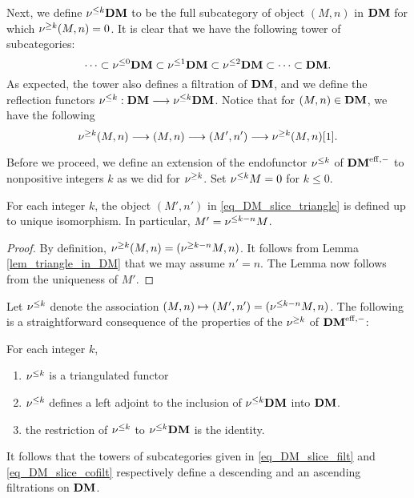 Next, we define $\nu^{\leq k} \mathbf{DM}$ to be the full subcategory of 
object $(M, n)$ in $\mathbf{DM}$ for which $\nu^{\geq k}(M, n) = 0$. It is
clear that we have the following tower of subcategories:
\begin{equation}\label{eq_DM_slice_cofilt}
\cdots \subset \nu^{\leq 0}\mathbf{DM} \subset \nu^{\leq 1}\mathbf{DM} \subset \nu^{\leq 2}\mathbf{DM} 
   \subset \cdots \subset \mathbf{DM}.
\end{equation}
As expected, the tower also defines a filtration of $\mathbf{DM}$, and
we define the reflection functors $\nu^{\leq k} : \mathbf{DM} \longrightarrow \nu^{\leq k} \mathbf{DM}$.
Notice that for $(M, n) \in \mathbf{DM}$, we have the following
\begin{equation}\label{eq_DM_slice_triangle}
\nu^{\geq k} (M, n) \longrightarrow (M, n) \longrightarrow (M', n') \longrightarrow \nu^{\geq k} (M, n)[1].
\end{equation}

Before we proceed, we define an extension of the endofunctor 
$\nu^{\leq k}$ of $\mathbf{DM}^{\mathrm{eff},-}$ to nonpositive integers $k$ as we did for 
$\nu^{\geq k}$. Set $\nu^{\leq k} M = 0$ for $k \leq 0$.

\begin{lem}
For each integer $k$, the object $(M', n')$ in 
\eqref{eq_DM_slice_triangle} is defined up to unique isomorphism. 
In particular, $M' = \nu^{\leq k - n} M$.
\end{lem}
\begin{proof}
By definition, $\nu^{\geq k}(M, n) = (\nu^{\geq k - n}M, n)$. It follows 
from Lemma \ref{lem_triangle_in_DM} that we may assume $n' = n$. 
The Lemma now follows from the uniqueness of $M'$.
\end{proof}

Let $\nu^{\leq k}$ denote the association $(M, n) \mapsto (M', n') =
(\nu^{\leq k - n}M, n)$. The following is a straightforward consequence
of the properties of the $\nu^{\geq k}$ of $\mathbf{DM}^{\mathrm{eff},-}$:

\begin{prop}
For each integer $k$,
\begin{enumerate}
\item $\nu^{\leq k}$ is a triangulated functor

\item $\nu^{\leq k}$ defines a left adjoint to the inclusion of $\nu^{\leq k}\mathbf{DM}$
into $\mathbf{DM}$.

\item the restriction of $\nu^{\leq k}$ to $\nu^{\leq k}\mathbf{DM}$ is the identity.
\end{enumerate}
\end{prop}

It follows that the towers of subcategories given in 
\eqref{eq_DM_slice_filt} and \eqref{eq_DM_slice_cofilt} 
respectively define a descending and an ascending filtrations on 
$\mathbf{DM}$.

